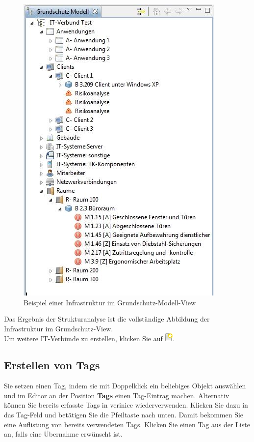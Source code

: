 \documentclass[a4paper,10pt]{book}
\begin{document}
\begin{figure}[htb!]
  \centering
  \includegraphics[scale=.65]{Screenshot/GS_Modell_Baumstruktur.jpg}
  \caption{\label{fig:beispiel-einer-infrastruktur-im-grundschutz-modell-view}
    Beispiel einer Infrastruktur im Grundschutz-Modell-View}
\end{figure}
Das Ergebnis der Strukturanalyse ist die vollständige Abbildung der Infrastruktur im Grundschutz-View.
\newline\\
Um weitere IT-Verbünde zu erstellen, klicken Sie auf \includegraphics[height=2ex]{Icon/Oeffnen.png}.

\subsection{Erstellen von Tags}
Sie setzen einen Tag, indem sie mit Doppelklick ein beliebiges Objekt
auswählen und im Editor an der Position \textbf{Tags} einen
Tag-Eintrag machen.  Alternativ können Sie bereits erfasste Tags in
verinice wiederverwenden.  Klicken Sie dazu in das Tag-Feld und
betätigen Sie die Pfeiltaste nach unten.  Damit bekommen Sie eine
Auflistung von bereits verwendeten Tags. Klicken Sie einen Tag aus der
Liste an, falls eine Übernahme erwünscht ist.
\end{document}
